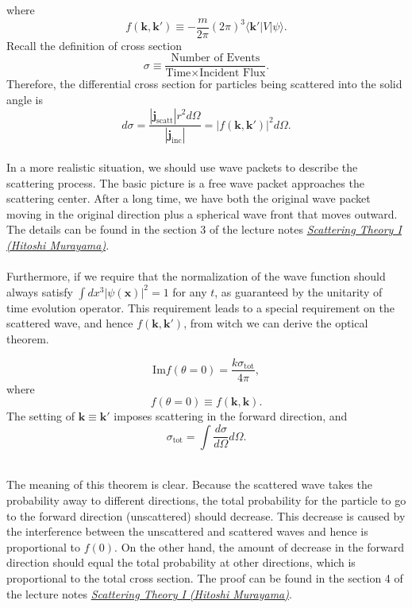 where
\[f(\bm{k},\bm{k}') \equiv - \frac{m}{2\pi} (2\pi)^3  \langle \bm{k}'| V | \psi\rangle .\]
Recall the definition of cross section
\[\sigma \equiv \frac{\mbox{Number of Events}}{\mbox{Time} \times \mbox{Incident Flux}}.\]
Therefore, the differential cross section for particles being scattered into the solid angle is
\[d\sigma = \frac{|\bm{j}_{\mathrm{scatt}}| r^2 d\Omega}{|\bm{j}_{\mathrm{inc}}|} = |f(\bm{k},\bm{k}')|^2 d\Omega.\]
\\
In a more realistic situation, we should use wave packets to describe the scattering process. The basic picture is a free wave packet approaches the scattering center. After a long time, we have both the original wave packet moving in the original direction plus a spherical wave front that moves outward. The details can be found in the section 3 of the lecture notes 
\href{http://hitoshi.berkeley.edu/221B/index.html}{\emph{Scattering Theory I (Hitoshi Murayama)}}.
\\ \\
Furthermore, if we require that the normalization of the wave function should always satisfy $\int dx^3 |\psi(\bm{x})|^2 = 1$ for any $t$, as guaranteed by the unitarity of time evolution operator. This requirement leads to a special requirement on the scattered wave, and hence $f(\bm{k},\bm{k}')$, from witch we can derive the optical theorem.\\

\begin{newthem}
\[\mathrm{Im} f(\theta = 0) = \frac{k\sigma_{\mathrm{tot}}}{4\pi},\]
where
\[f(\theta = 0) \equiv f(\bm{k},\bm{k}).\]
The setting of $\bm{k} \equiv \bm{k}'$ imposes scattering in the forward direction, and
\[\sigma_{\mathrm{tot}} = \int \frac{d\sigma}{d\Omega} d\Omega.\]
\end{newthem}
\noindent
\\
The meaning of this theorem is clear. Because the scattered wave takes the probability away to different directions, the total probability for the particle to go to the forward direction (unscattered) should decrease. This decrease is caused by the interference between the unscattered and scattered waves and hence is proportional to $f(0)$. On the other hand, the amount of decrease in the forward direction should equal the total probability at other directions, which is proportional to the total cross section. The proof can be found in the section 4 of the lecture notes \href{http://hitoshi.berkeley.edu/221B/index.html}{\emph{Scattering Theory I (Hitoshi Murayama)}}.

